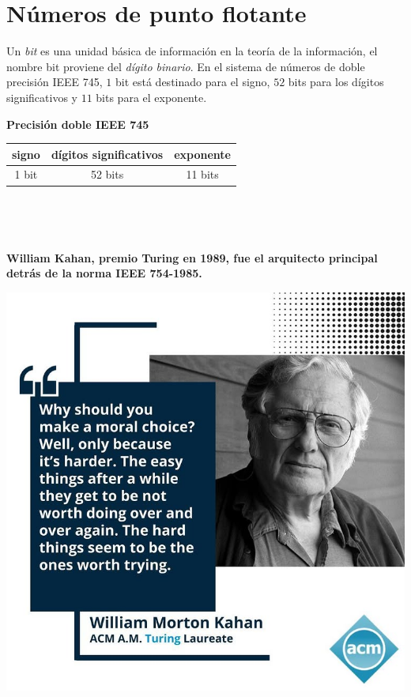 \documentclass[a4paper,10pt]{scrartcl}
\theoremstyle{definition}
\begin{document}
\section{Números de punto flotante}

Un \emph{bit} es una unidad básica de información en la teoría de la
información, el nombre bit proviene del \emph{dígito binario}.
En el sistema de números de doble precisión IEEE 745, $1$ bit está
destinado para el signo, $52$ bits para los dígitos significativos y
$11$ bits para el exponente.

\begin{minipage}{0.35\paperwidth}
    \centering
    \textbf{Precisión doble IEEE 745}\\[.3\baselineskip]
    \begin{tabular}{|c|c|c|}
        \hline
        signo & dígitos significativos & exponente \\
        \hline
        1 bit & 52 bits                & 11 bits   \\
        \hline
    \end{tabular}

    \

    \

    \begin{flushleft}
        \textbf{\bfseries William Kahan, premio Turing en 1989, fue
            el arquitecto principal detrás de la norma IEEE 754-1985.}
    \end{flushleft}
\end{minipage}
\hfill
\begin{minipage}{0.35\paperwidth}
    \centering
    \includegraphics[width=.25\paperwidth]{kahan}
\end{minipage}
\end{document}

